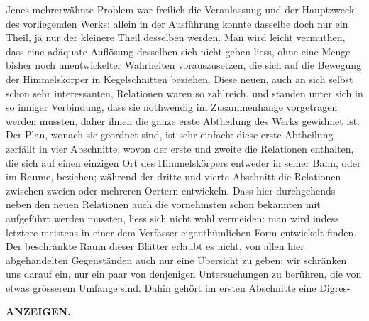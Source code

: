 Jenes mehrerwähnte Problem war freilich die Veranlassung und der Hauptzweck des vorliegenden Werks: allein in der Ausführung konnte dasselbe doch nur ein Theil, ja nur der kleinere Theil desselben werden. Man wird leicht vermuthen, dass eine adäquate Auflösung desselben sich nicht geben liess, ohne eine Menge bisher noch unentwickelter Wahrheiten vorauszusetzen, die sich auf die Bewegung der Himmelskörper in Kegelschnitten beziehen. Diese neuen, auch an sich selbst schon sehr interessanten, Relationen waren so zahlreich, und standen unter sich in so inniger Verbindung, dass sie nothwendig im Zusammenhange vorgetragen werden mussten, daher ihnen die ganze erste Abtheilung des Werks gewidmet ist. Der Plan, wonach sie geordnet sind, ist sehr einfach: diese erste Abtheilung zerfällt in vier Abschnitte, wovon der erste und zweite die Relationen enthalten, die sich auf einen einzigen Ort des Himmelskörpers entweder in seiner Bahn, oder im Raume, beziehen; während der dritte und vierte Abschnitt die Relationen zwischen zweien oder mehreren Oertern entwickeln. Dass hier durchgehends neben den neuen Relationen auch die vornehmsten schon bekannten mit aufgeführt werden mussten, liess sich nicht wohl vermeiden: man wird indess letztere meistens in einer dem Verfasser eigenthümlichen Form entwickelt finden. Der beschränkte Raum dieser Blätter erlaubt es nicht, von allen hier abgehandelten Gegenständen auch nur eine Übersicht zu geben; wir schränken uns darauf ein, nur ein paar von denjenigen Untersuchungen zu berühren, die von etwas grösserem Umfange sind. Dahin gehört im ersten Abschnitte eine Digres-
\par{}
\par\clearpage
\thispagestyle{empty}
\noindent{}%
%
\parbox[t]{\dimexpr\linewidth-24mm\relax}{\centering\footnotesize\bfseries ANZEIGEN.\par}%
\makebox[12mm][r]{}\par\nobreak\medskip
